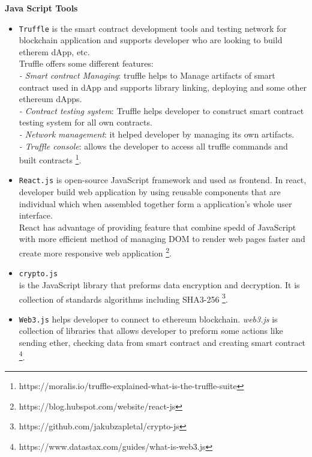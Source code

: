 \textbf{Java Script Tools} \\
\begin{itemize}
  \item \texttt{Truffle} is the smart contract development tools and testing network for blockchain application and supports developer who are looking to build etherem dApp, etc. \\
 Truffle offers some different features: \\
 \hspace{1cm} \textit{- Smart contract Managing}: truffle helps to Manage artifacts of smart contract used in dApp and supports library linking, deploying and some other ethereum dApps. \\
 \hspace{3cm} \textit{- Contract testing system}: Truffle helps developer to construct smart contract testing system for all own contracts. \\
 \hspace{3cm} \textit{- Network management}: it helped developer by managing its own artifacts. \\
 \hspace{3cm} \textit{- Truffle console}: allows the developer to access all truffle commands and built contracts \footnote{https://moralis.io/truffle-explained-what-is-the-truffle-suite}.
\item \texttt{React.js} is open-source JavaScript framework and used as frontend. In react, developer build web application by using reusable components that are individual which when assembled together form a application's whole user interface.\\
React has advantage of providing feature that combine spedd of JavaScript with more efficient method of managing DOM to render web pages faster and create more responsive web application \footnote{https://blog.hubspot.com/website/react-js}.\\
\item \texttt{crypto.js} \\
is the JavaScript library that preforms data encryption and decryption. It is collection of standards algorithms including SHA3-256 \footnote{{https://github.com/jakubzapletal/crypto-js}}.
\item \texttt{Web3.js} helps developer to connect to ethereum blockchain. \textit{web3.js} is collection of libraries that allows developer to preform some actions like sending ether, checking data from smart contract and creating smart contract \footnote{https://www.datastax.com/guides/what-is-web3.js}.\\

\end{itemize}
